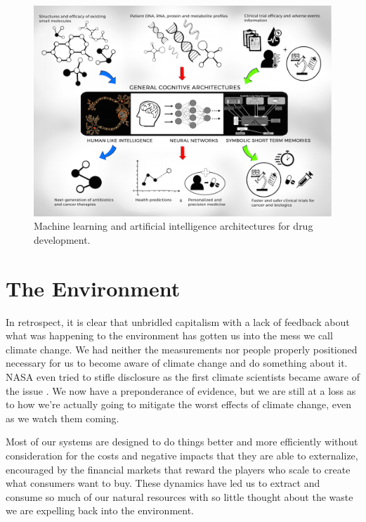 \begin{figure}[h]
\includegraphics[width=\linewidth]{pictures/AI_DD-pratik}
\caption{Machine learning and artificial intelligence architectures for drug development. \cite{shahmlimage}}
\label{fig:drugai}
\end{figure}

\section{The Environment}
\label{sec:2environment}

In retrospect, it is clear that unbridled capitalism with a lack of feedback about what was happening to the environment has gotten us into the mess we call climate change. We had neither the measurements nor people properly positioned necessary for us to become aware of climate change and do something about it. \ac{NASA} even tried to stifle disclosure as the first climate scientists became aware of the issue \cite{winters2008investigative}. We now have a preponderance of evidence, but we are still at a loss as to how we're actually going to mitigate the worst effects of climate change, even as we watch them coming.

Most of our systems are designed to do things better and more efficiently without consideration for the costs and negative impacts that they are able to externalize, encouraged by the financial markets that reward the players who scale to create what consumers want to buy. These dynamics have led us to extract and consume so much of our natural resources with so little thought about the waste we are expelling back into the environment. 

